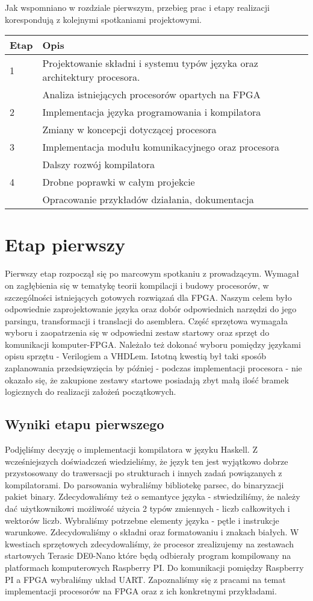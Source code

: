 Jak wspomniano w rozdziale pierwszym, przebieg prac i etapy realizacji korespondują z kolejnymi spotkaniami projektowymi.
\begin{table}[!ht]
\begin{tabular}{|l|l|} \hline
Etap & Opis\\ \hline
1 & Projektowanie składni i systemu typów języka oraz architektury procesora. \\
  & Analiza istniejących procesorów opartych na FPGA\\  \hline
2 & Implementacja języka programowania i kompilatora \\
  & Zmiany w koncepcji dotyczącej procesora\\ \hline
3 & Implementacja modułu komunikacyjnego oraz procesora\\
  & Dalszy rozwój kompilatora \\ \hline
4 & Drobne poprawki w całym projekcie\\
  & Opracowanie przykładów działania, dokumentacja\\
\hline
\end{tabular}
\end{table}

\section{Etap pierwszy}
Pierwszy etap rozpoczął się po marcowym spotkaniu z prowadzącym. Wymagał on zagłębienia się w tematykę teorii kompilacji i budowy procesorów, w szczególności istniejących gotowych rozwiązań dla FPGA. Naszym celem było odpowiednie zaprojektowanie języka oraz dobór odpowiednich narzędzi do jego parsingu, transformacji i translacji do asemblera. Część sprzętowa wymagała wyboru i zaopatrzenia się w odpowiedni zestaw startowy oraz sprzęt do komunikacji komputer-FPGA. Należało też dokonać wyboru pomiędzy językami opisu sprzętu - Verilogiem a VHDLem. Istotną kwestią był taki sposób zaplanowania przedsięwzięcia by później - podczas implementacji procesora - nie okazało się, że zakupione zestawy startowe posiadają zbyt małą ilość bramek logicznych do realizacji założeń początkowych.
\subsection{Wyniki etapu pierwszego}
Podjęliśmy decyzję o implementacji kompilatora w języku Haskell. Z wcześniejszych doświadczeń wiedzieliśmy, że język ten jest wyjątkowo dobrze przystosowany do trawersacji po strukturach i innych zadań powiązanych z kompilatorami. Do parsowania wybraliśmy bibliotekę parsec, do binaryzacji pakiet binary. Zdecydowaliśmy też o semantyce języka - stwiedziliśmy, że należy dać użytkownikowi możliwość użycia 2 typów zmiennych - liczb całkowitych i wektorów liczb. Wybraliśmy potrzebne elementy języka - pętle i instrukcje warunkowe. Zdecydowaliśmy o składni oraz formatowaniu i znakach białych. W kwestiach sprzętowych zdecydowaliśmy, że procesor zrealizujemy na zestawach startowych Terasic DE0-Nano które będą odbierały program kompilowany na platformach komputerowych Raspberry PI. Do komunikacji pomiędzy Raspberry PI a FPGA wybraliśmy układ UART. Zapoznaliśmy się z pracami na temat implementacji procesorów na FPGA oraz z ich konkretnymi przykładami.  
